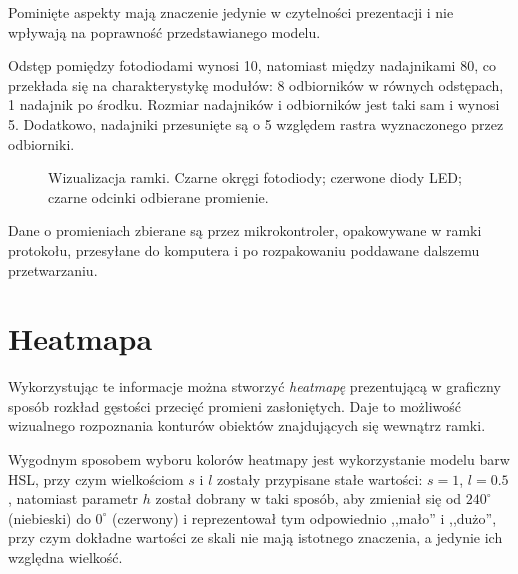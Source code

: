Pominięte aspekty mają znaczenie jedynie w czytelności prezentacji i nie wpływają na poprawność przedstawianego modelu.

Odstęp pomiędzy fotodiodami wynosi 10, natomiast między nadajnikami 80, co przekłada się na charakterystykę modułów: 8 odbiorników w równych odstępach, 1 nadajnik po środku. Rozmiar nadajników i odbiorników jest taki sam i wynosi 5. Dodatkowo, nadajniki przesunięte są o 5 względem rastra wyznaczonego przez odbiorniki.\\

\begin{figure}
 \centering
 \makebox[\textwidth][r]{
  \resizebox{.9\largefigure}{!}{
    \def\svgwidth{0.9\largefigure}
    
  }
 }
 \caption{Wizualizacja ramki. Czarne okręgi \ppauza fotodiody; czerwone \ppauza diody LED; czarne odcinki \ppauza odbierane promienie.}
 \label{fig:scene_rays_sample}
\end{figure}

Dane o promieniach zbierane są przez mikrokontroler, opakowywane w ramki protokołu, przesyłane do komputera i po rozpakowaniu poddawane dalszemu przetwarzaniu.\\

\section{Heatmapa}

Wykorzystując te informacje można stworzyć \textit{heatmapę} prezentującą w graficzny sposób rozkład gęstości przecięć promieni zasłoniętych. Daje to możliwość wizualnego rozpoznania konturów obiektów znajdujących się wewnątrz ramki.

Wygodnym sposobem wyboru kolorów heatmapy jest wykorzystanie modelu barw HSL, przy czym wielkościom $s$ i $l$ zostały przypisane stałe wartości: $s = 1$, $l = 0.5$, natomiast parametr $h$ został dobrany w taki sposób, aby zmieniał się od $240^{\circ}$ (niebieski) do $0^{\circ}$ (czerwony) i reprezentował tym odpowiednio ,,mało'' i ,,dużo'', przy czym dokładne wartości ze skali nie mają istotnego znaczenia, a jedynie ich względna wielkość.

